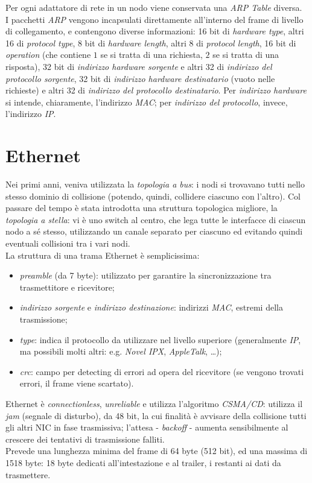 Per ogni adattatore di rete in un nodo viene conservata una \textit{ARP Table} diversa. \\
I pacchetti \textit{ARP} vengono incapsulati direttamente all'interno del frame di livello di collegamento, e contengono diverse informazioni: 16 bit di \textit{hardware type}, altri 16 di \textit{protocol type}, 8 bit di \textit{hardware length}, altri 8 di \textit{protocol length}, 16 bit di \textit{operation} (che contiene $1$ se si tratta di una richiesta, $2$ se si tratta di una risposta), 32 bit di \textit{indirizzo hardware sorgente} e altri 32 di \textit{indirizzo del protocollo sorgente}, 32 bit di \textit{indirizzo hardware destinatario} (vuoto nelle richieste) e altri 32 di \textit{indirizzo del protocollo destinatario}. Per \textit{indirizzo hardware} si intende, chiaramente, l'indirizzo \textit{MAC}; per \textit{indirizzo del protocollo}, invece, l'indirizzo \textit{IP}.

\section{Ethernet}
Nei primi anni, veniva utilizzata la \textit{topologia a bus}: i nodi si trovavano tutti nello stesso dominio di collisione (potendo, quindi, collidere ciascuno con l'altro). Col passare del tempo è stata introdotta una struttura topologica migliore, la \textit{topologia a stella}: vi è uno switch al centro, che lega tutte le interfacce di ciascun nodo a sé stesso, utilizzando un canale separato per ciascuno ed evitando quindi eventuali collisioni tra i vari nodi. \\
La struttura di una trama Ethernet è semplicissima:
\begin{itemize}
	\item \textit{preamble} (da 7 byte): utilizzato per garantire la sincronizzazione tra trasmettitore e ricevitore;
	\item \textit{indirizzo sorgente} e \textit{indirizzo destinazione}: indirizzi \textit{MAC}, estremi della trasmissione;
	\item \textit{type}: indica il protocollo da utilizzare nel livello superiore (generalmente \textit{IP}, ma possibili molti altri: e.g. \textit{Novel IPX}, \textit{AppleTalk}, \ldots);
	\item \textit{crc}: campo per detecting di errori ad opera del ricevitore (se vengono trovati errori, il frame viene scartato).
\end{itemize}
Ethernet è \textit{connectionless}, \textit{unreliable} e utilizza l'algoritmo \textit{CSMA/CD}: utilizza il \textit{jam} (segnale di disturbo), da 48 bit, la cui finalità è avvisare della collisione tutti gli altri NIC in fase trasmissiva; l'attesa - \textit{backoff} - aumenta sensibilmente al crescere dei tentativi di trasmissione falliti. \\
Prevede una lunghezza minima del frame di 64 byte (512 bit), ed una massima di 1518 byte: 18 byte dedicati all'intestazione e al trailer, i restanti ai dati da trasmettere.

